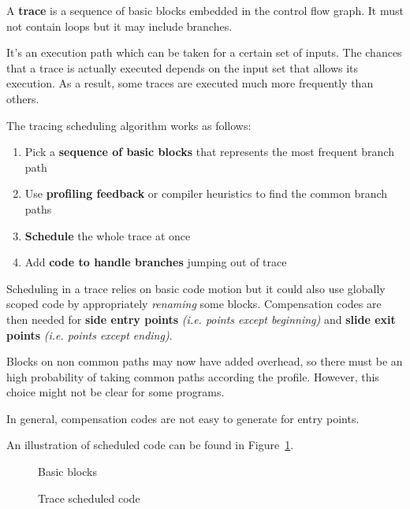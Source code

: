 \documentclass[english]{article}
\begin{document}
\bigskip

A \textbf{trace} is a sequence of basic blocks embedded in the control flow graph.
It must not contain loops but it may include branches.

It's an execution path which can be taken for a certain set of inputs.
The chances that a trace is actually executed depends on the input set that allows its execution.
As a result, some traces are executed much more frequently than others.

The tracing scheduling algorithm works as follows:

\begin{enumerate}
  \item Pick a \textbf{sequence of basic blocks} that represents the most frequent branch path
  \item Use \textbf{profiling feedback} or compiler heuristics to find the common branch paths
  \item \textbf{Schedule} the whole trace at once
  \item Add \textbf{code to handle branches} jumping out of trace
\end{enumerate}

Scheduling in a trace relies on basic code motion but it could also use globally scoped code by appropriately \textit{renaming} some blocks.
Compensation codes are then needed for \textbf{side entry points} \textit{(i.e. points except beginning)} and \textbf{slide exit points} \textit{(i.e. points except ending)}.

Blocks on non common paths may now have added overhead, so there must be an high probability of taking common paths according the profile.
However, this choice might not be clear for some programs.

In general, compensation codes are not easy to generate for entry points.

\bigskip
An illustration of scheduled code can be found in Figure~\ref{fig:trace-scheduled-code}.

\begin{figure}[htbp]
  \bigskip
  \centering

  \begin{minipage}[b]{0.45\textwidth}
    \centering
    \caption{Basic blocks}
    \label{fig:basic-blocks}
  \end{minipage}
  \begin{minipage}[b]{0.45\textwidth}
    \centering
    \caption{Trace scheduled code}
    \label{fig:trace-scheduled-code}
  \end{minipage}

  \bigskip
\end{figure}
\end{document}
